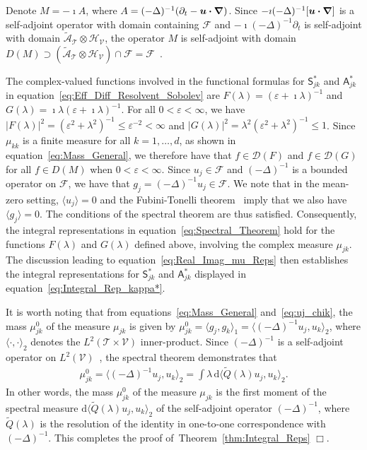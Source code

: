 \documentclass[leqno,onefignum,onetabnum]{siamltex1213}
\newcommand{\thmref}[1]{Theorem~\ref{#1}}
\renewcommand{\d}{\mathrm{d}}
\newcommand{\Tc}{\mathcal{T}}
\newcommand{\Vc}{\mathcal{V}}
\newcommand{\Sm}{\mathsf{S}}
\newcommand{\Am}{\mathsf{A}}
\newcommand{\Hs}{\mathscr{H}}
\newcommand{\As}{\mathscr{A}}
\newcommand{\Ds}{\mathscr{D}}
\newcommand{\Fs}{\mathscr{F}}
\newcommand\bnabla{\mbox{\boldmath${\nabla}$}}
\providecommand\bcdot{\boldsymbol{\cdot}}
\newcommand{\vecu}{\boldsymbol{u}}
\begin{document}
Denote $M=-\imath A$, where $A=(-\Delta)^{-1}(\partial_t-\vecu\bcdot\bnabla)$. Since
$-\imath(-\Delta)^{-1}[\vecu\bcdot\bnabla]$ is a self-adjoint
operator with domain containing $\Fs$ and 
$-\imath(-\Delta)^{-1}\partial_t$ is self-adjoint with domain
$\tilde{\As}_{\Tc}\otimes\Hs_{\Vc}$, the operator $M$ is self-adjoint with 
domain $D(M)\supset(\tilde{\As}_{\Tc}\otimes\Hs_{\Vc})\cap\Fs=\Fs$~\cite{Stone:64}.




The
complex-valued functions involved in the functional formulas for
$\Sm^*_{jk}$ and $\Am^*_{jk}$ in
equation~\eqref{eq:Eff_Diff_Resolvent_Sobolev} are $F(\lambda)=(\varepsilon+\imath\lambda)^{-1}$
and $G(\lambda)=\imath\lambda(\varepsilon+\imath\lambda)^{-1}$. For all $0<\varepsilon<\infty$, 
we have $|F(\lambda)|^2=(\varepsilon^2+\lambda^2)^{-1}\leq\varepsilon^{-2}<\infty$ and 
$|G(\lambda)|^2=\lambda^2(\varepsilon^2+\lambda^2)^{-1}\leq 1$. Since $\mu_{kk}$ is a finite measure
for all $k=1,\ldots,d$, as shown in equation~\eqref{eq:Mass_General}, we
therefore have 
that $f\in\Ds(F)$ and $f\in\Ds(G)$ for all $f\in D(M)$ when $0<\varepsilon<\infty$. Since $u_j\in\Fs$ and $(-\Delta)^{-1}$ is a bounded operator on $\Fs$, we have that 
$g_j=(-\Delta)^{-1}u_j\in\Fs$. We note that in the mean-zero setting,
$\langle u_j\rangle=0$ and the Fubini-Tonelli theorem~\cite{Folland:99:RealAnalysis} 
imply that we also have $\langle g_j\rangle=0$. The conditions of the spectral
theorem are thus satisfied. Consequently, the integral representations in
equation~\eqref{eq:Spectral_Theorem} hold for the functions $F(\lambda)$ and
$G(\lambda)$ defined above, involving the complex measure $\mu_{jk}$. The
discussion leading to equation~\eqref{eq:Real_Imag_mu_Reps} then
establishes the integral representations for $\Sm^*_{jk}$ and
$\Am^*_{jk}$ displayed in equation~\eqref{eq:Integral_Rep_kappa*}.



It is worth noting that from
equations~\eqref{eq:Mass_General} and~\eqref{eq:uj_chik}, the mass
$\mu_{jk}^0$ of the measure $\mu_{jk}$ is given by
$\mu_{jk}^0=\langle g_j,g_k\rangle_1=\langle(-\Delta)^{-1}u_j,u_k\rangle_2$, where $\langle\cdot,\cdot\rangle_2$ denotes
the $L^2(\Tc\times\Vc)$ inner-product. Since
$(-\Delta)^{-1}$ is a self-adjoint operator on
$L^2(\Vc)$~\cite{Stakgold:BVP:2000}, the spectral theorem demonstrates
that  
%
\begin{align}\label{eq:Laplacian_moment}
  \mu_{jk}^0=\langle(-\Delta)^{-1}u_j,u_k\rangle_2=\int\lambda\,\d\langle\tilde{Q}(\lambda)u_j,u_k\rangle_2.
\end{align}
%
In other words, the mass $\mu_{jk}^0$ of the measure $\mu_{jk}$ is the first moment
of the spectral measure $\d\langle\tilde{Q}(\lambda)u_j,u_k\rangle_2$ of the
self-adjoint operator $(-\Delta)^{-1}$, where $\tilde{Q}(\lambda)$ is the
resolution of the identity in one-to-one correspondence with
$(-\Delta)^{-1}$. This completes the proof of~\thmref{thm:Integral_Reps} $\Box$. 
\end{document}
